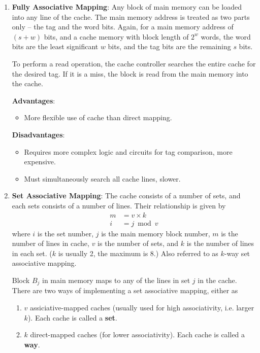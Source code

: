\begin{enumerate}
\item \textbf{Fully Associative Mapping}:
    Any block of main memory can be loaded into any line of the cache. The main memory
    address is treated as two parts only -- the tag and the word bits. Again, for a main
    memory address of $(s+w)$ bits, and a cache memory with block length of $2^w$ words,
    the word bits are the least significant $w$ bits, and the tag bits are the remaining
    $s$ bits.

    To perform a read operation, the cache controller searches the entire cache for the
    desired tag. If it is a miss, the block is read from the main memory into the cache.

    \begin{multicols}{2}
        \textbf{Advantages}: \begin{itemize}
            \item More flexible use of cache than direct mapping.
        \end{itemize}
        \columnbreak
        \textbf{Disadvantages}: \begin{itemize}
            \item Requires more complex logic and circuits for tag comparison, more expensive.
            \item Must simultaneously search all cache lines, slower.
        \end{itemize}
    \end{multicols}

\item \textbf{Set Associative Mapping}:
    The cache consists of a number of sets, and each sets consists of a number of lines.
    Their relationship is given by
    \begin{align*}
        m &= v \times k \\
        i &= j \bmod v
    \end{align*}
    where $i$ is the set number, $j$ is the main memory block number, $m$ is the number
    of lines in cache, $v$ is the number of sets, and $k$ is the number of lines in each set.
    ($k$ is usually 2, the maximum is 8.) Also referred to as $k$-way set associative mapping.

    Block $B_j$ in main memory maps to any of the lines in set $j$ in the cache. There are
    two ways of implementing a set associative mapping, either as
    \begin{enumerate}
        \item $v$ assiciative-mapped caches 
            (usually used for high associativity, i.e. larger $k$).
            Each cache is called a \textbf{set}.
        \item $k$ direct-mapped caches (for lower associativity).
            Each cache is called a \textbf{way}.
    \end{enumerate}


\end{enumerate}
